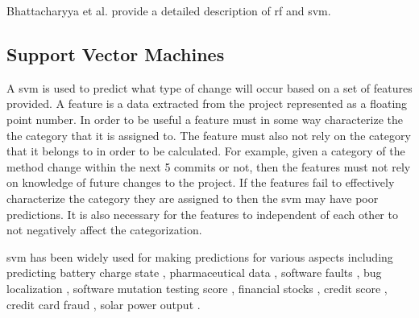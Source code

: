 Bhattacharyya et al. provide a detailed description of \gls{rf} and \gls{svm}.

\subsection{Support Vector Machines}
\label{subsec:svm_prediction}


A \gls{svm} is used to predict what type of change will occur based on a set of features provided. A feature is a data extracted from the project represented as a floating point number. In order to be useful a feature must in some way characterize the the category that it is assigned to. The feature must also not rely on the category that it belongs to in order to be calculated. For example, given a category of the method change within the next 5 commits or not, then the features must not rely on knowledge of future changes to the project. If the features fail to effectively characterize the category they are assigned to then the \gls{svm} may have poor predictions. It is also necessary for the features to independent of each other to not negatively affect the categorization.


\gls{svm} has been widely used for making predictions for various aspects including predicting battery charge state \cite{Anton2013}, pharmaceutical data \cite{Burbidge2001}, software faults \cite{Gondra2008, Erturk2015, Malhotra2015, Kim2008, Moeyersoms2015, Neuhaus2007}, bug localization \cite{Murphy2007, Neuhaus2007}, software mutation testing score \cite{Jalbert2012}, financial stocks \cite{Kim2003}, credit score \cite{Huang2007}, credit card fraud \cite{Westland2011}, solar power output \cite{Zeng2016}.

